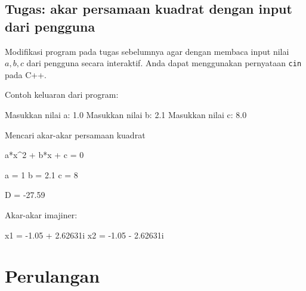 \documentclass[a4paper,11pt]{extarticle}
\begin{document}
\subsection{Tugas: akar persamaan kuadrat dengan input dari pengguna}

Modifikasi program pada tugas sebelumnya agar dengan membaca input
nilai $a, b, c$ dari pengguna secara interaktif. Anda
dapat menggunakan pernyataan \texttt{cin} pada C++.

Contoh keluaran dari program:
\begin{textcode}
Masukkan nilai a: 1.0
Masukkan nilai b: 2.1
Masukkan nilai c: 8.0

Mencari akar-akar persamaan kuadrat

a*x^2 + b*x + c = 0

a = 1
b = 2.1
c = 8

D = -27.59

Akar-akar imajiner:

x1 = -1.05 + 2.62631i
x2 = -1.05 - 2.62631i
\end{textcode}


\section{Perulangan}
\end{document}
